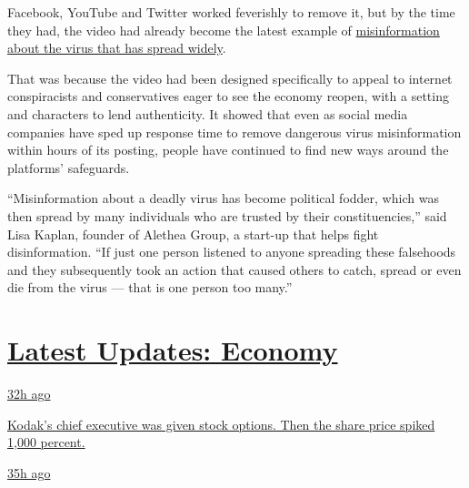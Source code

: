 Facebook, YouTube and Twitter worked feverishly to remove it, but by the
time they had, the video had already become the latest example of
\href{https://www.nytimes3xbfgragh.onion/2020/05/20/technology/plandemic-movie-youtube-facebook-coronavirus.html}{misinformation
about the virus that has spread widely}.

That was because the video had been designed specifically to appeal to
internet conspiracists and conservatives eager to see the economy
reopen, with a setting and characters to lend authenticity. It showed
that even as social media companies have sped up response time to remove
dangerous virus misinformation within hours of its posting, people have
continued to find new ways around the platforms' safeguards.

``Misinformation about a deadly virus has become political fodder, which
was then spread by many individuals who are trusted by their
constituencies,'' said Lisa Kaplan, founder of Alethea Group, a start-up
that helps fight disinformation. ``If just one person listened to anyone
spreading these falsehoods and they subsequently took an action that
caused others to catch, spread or even die from the virus --- that is
one person too many.''

\hypertarget{latest-updates-economy}{%
\section{\texorpdfstring{\href{https://www.nytimes3xbfgragh.onion/live/2020/07/31/business/stock-market-today-coronavirus?action=click\&pgtype=Article\&state=default\&region=MAIN_CONTENT_1\&context=storylines_live_updates}{Latest
Updates:
Economy}}{Latest Updates: Economy}}\label{latest-updates-economy}}

\href{https://www.nytimes3xbfgragh.onion/live/2020/07/31/business/stock-market-today-coronavirus?action=click\&pgtype=Article\&state=default\&region=MAIN_CONTENT_1\&context=storylines_live_updates\#kodaks-chief-executive-was-given-stock-options-then-the-share-price-spiked-1000-percent}{32h
ago}

\href{https://www.nytimes3xbfgragh.onion/live/2020/07/31/business/stock-market-today-coronavirus?action=click\&pgtype=Article\&state=default\&region=MAIN_CONTENT_1\&context=storylines_live_updates\#kodaks-chief-executive-was-given-stock-options-then-the-share-price-spiked-1000-percent}{Kodak's
chief executive was given stock options. Then the share price spiked
1,000 percent.}

\href{https://www.nytimes3xbfgragh.onion/live/2020/07/31/business/stock-market-today-coronavirus?action=click\&pgtype=Article\&state=default\&region=MAIN_CONTENT_1\&context=storylines_live_updates\#fitch-ratings-downgrades-its-outlook-on-us-debt}{35h
ago}

